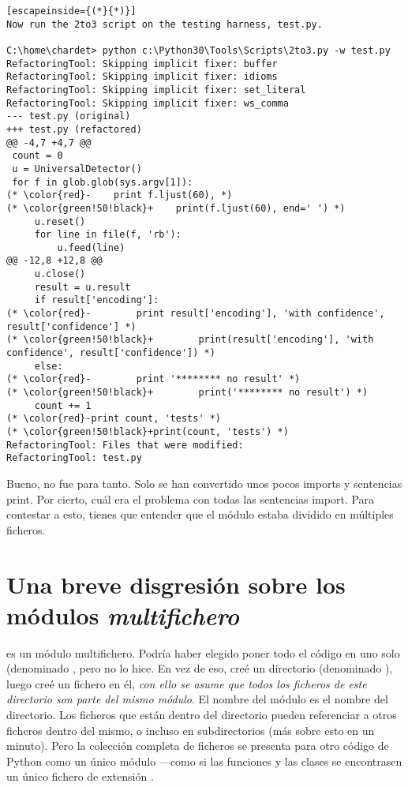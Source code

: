 \begin{lstlisting}[escapeinside={(*}{*)}]
Now run the 2to3 script on the testing harness, test.py.

C:\home\chardet> python c:\Python30\Tools\Scripts\2to3.py -w test.py
RefactoringTool: Skipping implicit fixer: buffer
RefactoringTool: Skipping implicit fixer: idioms
RefactoringTool: Skipping implicit fixer: set_literal
RefactoringTool: Skipping implicit fixer: ws_comma
--- test.py (original)
+++ test.py (refactored)
@@ -4,7 +4,7 @@
 count = 0
 u = UniversalDetector()
 for f in glob.glob(sys.argv[1]):
(* \color{red}-    print f.ljust(60), *)
(* \color{green!50!black}+    print(f.ljust(60), end=' ') *)
     u.reset()
     for line in file(f, 'rb'):
         u.feed(line)
@@ -12,8 +12,8 @@
     u.close()
     result = u.result
     if result['encoding']:
(* \color{red}-        print result['encoding'], 'with confidence', result['confidence'] *)
(* \color{green!50!black}+        print(result['encoding'], 'with confidence', result['confidence']) *)
     else:
(* \color{red}-        print '******** no result' *)
(* \color{green!50!black}+        print('******** no result') *)
     count += 1
(* \color{red}-print count, 'tests' *)
(* \color{green!50!black}+print(count, 'tests') *)
RefactoringTool: Files that were modified:
RefactoringTool: test.py
\end{lstlisting}

Bueno, no fue para tanto. Solo se han convertido unos pocos imports y sentencias print. Por cierto, cuál era el problema con todas las sentencias import. Para contestar a esto, tienes que entender que el módulo  estaba dividido en múltiples ficheros.

\section{Una breve disgresión sobre los módulos \emph{multifichero}}

 es un módulo multifichero. Podría haber elegido poner todo el código en uno solo (denominado , pero no lo hice. En vez de eso, creé un directorio (denominado ), luego creé un fichero  en él, \emph{con ello se asume que todos los ficheros de este directorio son parte del mismo módulo}. El nombre del módulo es el nombre del directorio. Los ficheros que están dentro del directorio pueden referenciar a otros ficheros dentro del mismo, o incluso en subdirectorios (más sobre esto en un minuto). Pero la colección completa de ficheros se presenta para otro código de Python como un único módulo ---como si las funciones y las clases se encontrasen un único fichero de extensión .


